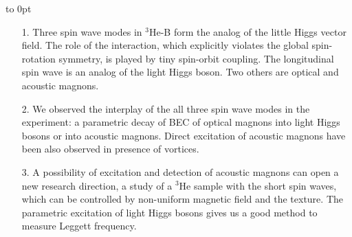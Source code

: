 \vbox to 0pt{\parbox{24cm}{
\begin{itemize}
\item[1.] 
Three spin wave modes in $^3$He-B form the analog of the
little Higgs vector field. The role of the interaction, which explicitly
violates the global spin-rotation symmetry, is played by tiny spin-orbit
coupling. The longitudinal spin wave is an analog of the light Higgs
boson. Two others are optical and acoustic magnons.
\item[2.]
We observed the interplay of the all three spin wave modes
in the experiment: a parametric decay of BEC of optical magnons
into light Higgs bosons or into acoustic magnons. Direct
excitation of acoustic magnons have been also observed in presence
of vortices.
\item[3.]
A possibility of excitation and detection of acoustic magnons can open a
new research direction, a study of a $^3$He sample with the short spin
waves, which can be controlled by non-uniform magnetic field and the
texture. The parametric excitation of light Higgs bosons gives us a good
method to measure Leggett frequency.
\end{itemize}
}\hss}